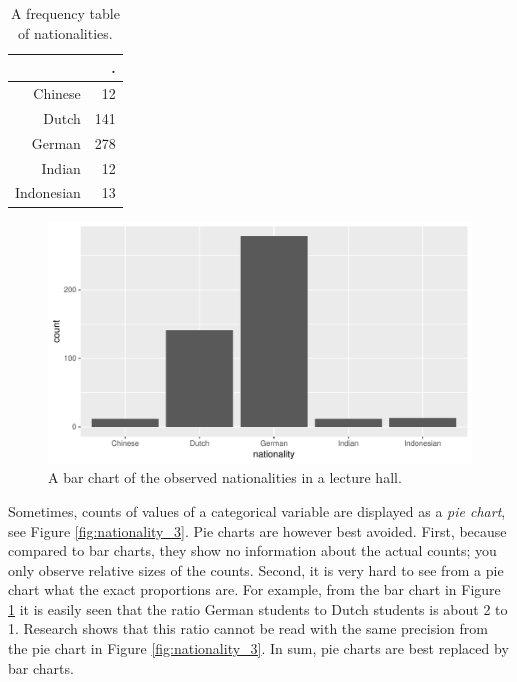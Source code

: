 \documentclass[]{book}\usepackage[]{graphicx}\usepackage[]{color}
\makeatletter
\def\maxwidth{ %
  \ifdim\Gin@nat@width>\linewidth
    \linewidth
  \else
    \Gin@nat@width
  \fi
}
\newenvironment{knitrout}{}{} %
\makeatother
\begin{document}
\begin{table}[ht]
\centering
\caption{A frequency table of nationalities.} 
\label{tab:nationality_1}
\begin{tabular}{rr}
  \hline
 & . \\ 
  \hline
Chinese & 12 \\ 
  Dutch & 141 \\ 
  German & 278 \\ 
  Indian & 12 \\ 
  Indonesian & 13 \\ 
   \hline
\end{tabular}
\end{table}


\begin{knitrout}
\color{fgcolor}\begin{figure}

{\centering \includegraphics[width=\maxwidth]{figure/nationality_2-1} 

}

\caption[A bar chart of the observed nationalities in a lecture hall]{A bar chart of the observed nationalities in a lecture hall.}\label{fig:nationality_2}
\end{figure}


\end{knitrout}

Sometimes, counts of values of a categorical variable are displayed as a \textit{pie chart}, see Figure \ref{fig:nationality_3}. Pie charts are however best avoided. First, because compared to bar charts, they show no information about the actual counts; you only observe relative sizes of the counts. Second, it is very hard to see from a pie chart what the exact proportions are. For example, from the bar chart in Figure \ref{fig:nationality_2} it is easily seen that the ratio German students to Dutch students is about 2 to 1. Research shows that this ratio cannot be read with the same precision from the pie chart in Figure \ref{fig:nationality_3}. In sum, pie charts are best replaced by bar charts.
\end{document}
